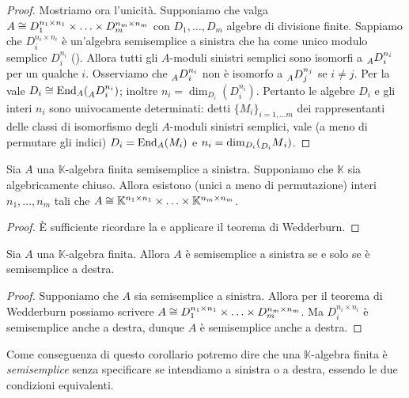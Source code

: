 \begin{proof}
Mostriamo ora l'unicità. Supponiamo che valga $A\cong D_1^{n_1\times n_1}\times\ldots\times D_m^{n_m\times n_m}$ con $D_1,\ldots,D_m$ algebre di divisione finite. Sappiamo che $D_i^{n_i\times n_i}$ è un'algebra semisemplice a sinistra che ha come unico modulo semplice $D_i^{n_i}$ (). Allora tutti gli $A$-moduli sinistri semplici sono isomorfi a $\prescript{}{A}{D}_i^{n_i}$ per un qualche $i$. Osserviamo che $\prescript{}{A}{D}_i^{n_i}$ non è isomorfo a $\prescript{}{A}{D}_j^{n_j}$ se $i\neq j$. Per la  vale $D_i\cong\operatorname{End}_A(\prescript{}{A}{D}_i^{n_i})$; inoltre $n_i=\dim_{D_i}(D_i^{n_i})$. Pertanto le algebre $D_i$ e gli interi $n_i$ sono univocamente determinati: detti $\{M_i\}_{i=1,\ldots m}$ dei rappresentanti delle classi di isomorfismo degli $A$-moduli sinistri semplici, vale (a meno di permutare gli indici) $D_i=\operatorname{End}_A(M_i)$ e $n_i=\dim_{D_i}(\prescript{}{D_i}{M}_i)$.
\end{proof}


\begin{corollary}
Sia $A$ una $\mathbb{K}$-algebra finita semisemplice a sinistra. Supponiamo che $\mathbb{K}$ sia algebricamente chiuso. Allora esistono (unici a meno di permutazione) interi $n_1,\ldots, n_m$ tali che $A\cong\mathbb{K}^{n_1\times n_1}\times\ldots\times \mathbb{K}^{n_m\times n_m}$.
\end{corollary}
\begin{proof}
È sufficiente ricordare la  e applicare il teorema di Wedderburn.
\end{proof}


\begin{corollary}
Sia $A$ una $\mathbb{K}$-algebra finita. Allora $A$ è semisemplice a sinistra se e solo se è semisemplice a destra.
\end{corollary}
\begin{proof}
Supponiamo che $A$ sia semisemplice a sinistra. Allora per il teorema di Wedderburn possiamo scrivere $A\cong D_1^{n_1\times n_1}\times\ldots\times D_m^{n_m\times n_m}$. Ma $D_i^{n_i\times n_i}$ è semisemplice anche a destra, dunque $A$ è semisemplice anche a destra.
\end{proof}


Come conseguenza di questo corollario potremo dire che una $\mathbb{K}$-algebra finita è \emph{semisemplice} senza specificare se intendiamo a sinistra o a destra, essendo le due condizioni equivalenti.


